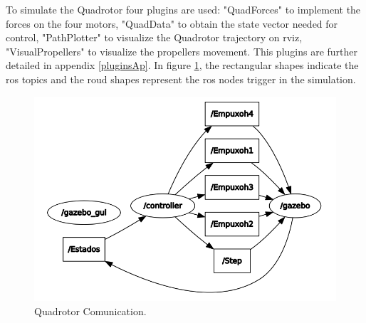 To simulate the Quadrotor four plugins are used: "QuadForces" to implement the forces on the four motors, "QuadData" to obtain the state vector needed for control, "PathPlotter" to visualize the Quadrotor trajectory on rviz, "VisualPropellers" to visualize the propellers movement. This plugins are further detailed in appendix \ref{pluginsAp}. In figure \ref{quadgraph}, the rectangular shapes indicate the ros topics and the roud shapes represent the ros nodes trigger in the simulation.


\begin{figure}[!ht]
	\centering
	\includegraphics[width=350pt]{figuras/quadgraph.png}
	\caption{Quadrotor Comunication.}
	\label{quadgraph}
\end{figure}
